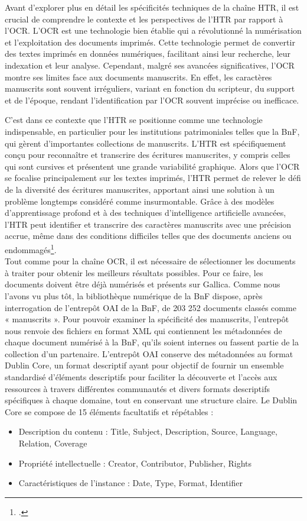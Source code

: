 \documentclass[a4paper,12pt,twoside]{book}
\begin{document}
	Avant d’explorer plus en détail les spécificités techniques de la chaîne HTR, il est crucial de comprendre le contexte et les perspectives de l’HTR par rapport à l’OCR. L’OCR est une technologie bien établie qui a révolutionné la numérisation et l’exploitation des documents imprimés. Cette technologie permet de convertir des textes imprimés en données numériques, facilitant ainsi leur recherche, leur indexation et leur analyse. Cependant, malgré ses avancées significatives, l’OCR montre ses limites face aux documents manuscrits. En effet, les caractères manuscrits sont souvent irréguliers, variant en fonction du scripteur, du support et de l’époque, rendant l’identification par l’OCR souvent imprécise ou inefficace. 
	
	C’est dans ce contexte que l’HTR se positionne comme une technologie indispensable, en particulier pour les institutions patrimoniales telles que la BnF, qui gèrent d’importantes collections de manuscrits. L’HTR est spécifiquement conçu pour reconnaître et transcrire des écritures manuscrites, y compris celles qui sont cursives et présentent une grande variabilité graphique. Alors que l’OCR se focalise principalement sur les textes imprimés, l’HTR permet de relever le défi de la diversité des écritures manuscrites, apportant ainsi une solution à un problème longtemps considéré comme insurmontable. Grâce à des modèles d’apprentissage profond et à des techniques d’intelligence artificielle avancées, l’HTR peut identifier et transcrire des caractères manuscrits avec une précision accrue, même dans des conditions difficiles telles que des documents anciens ou endommagés\footcite{cretin_transcription_2023}.
	\\
	
	Tout comme pour la chaîne OCR, il est nécessaire de sélectionner les documents à traiter pour obtenir les meilleurs résultats possibles. Pour ce faire, les documents doivent être déjà numérisés et présents sur Gallica. Comme nous l’avons vu plus tôt, la bibliothèque numérique de la BnF dispose, après interrogation de l’entrepôt OAI de la BnF, de 203 252 documents classés comme « manuscrits ». Pour pouvoir examiner la spécificité des manuscrits,  l’entrepôt nous renvoie des fichiers en format XML qui contiennent les métadonnées de chaque document numérisé à la BnF, qu'ils soient internes ou fassent partie de la collection d’un partenaire. L’entrepôt OAI conserve des métadonnées au format Dublin Core, un format descriptif ayant pour objectif de fournir un ensemble standardisé d’éléments descriptifs pour faciliter la découverte et l’accès aux ressources à travers différentes communautés et divers formats descriptifs spécifiques à chaque domaine, tout en conservant une structure claire. Le Dublin Core se compose de 15 éléments facultatifs et répétables :
	\begin{itemize}
		\item Description du contenu : Title, Subject, Description, Source, Language, Relation, Coverage
		\item Propriété intellectuelle : Creator, Contributor, Publisher, Rights
		\item Caractéristiques de l'instance : Date, Type, Format, Identifier
	\end{itemize}
	
\end{document}
